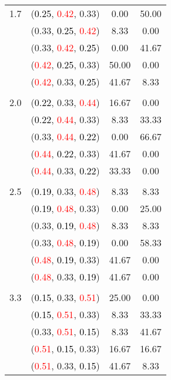 \documentclass[10pt,a4paper]{report}
\begin{document}
\begin{center}
\begin{longtable}{clcc}
		1.7			&(\textcolor{black}{0.25}, \textcolor{red}{0.42}, 0.33)&0.00&50.00\\
			&(0.33, \textcolor{black}{0.25}, \textcolor{red}{0.42})&8.33&0.00\\
			&(0.33, \textcolor{red}{0.42}, \textcolor{black}{0.25})&0.00&41.67\\
			&(\textcolor{red}{0.42}, \textcolor{black}{0.25}, 0.33)&50.00&0.00\\
			&(\textcolor{red}{0.42}, 0.33, \textcolor{black}{0.25})&41.67&8.33\\
		&&&\\
		2.0			&(\textcolor{black}{0.22}, 0.33, \textcolor{red}{0.44})&16.67&0.00\\
			&(\textcolor{black}{0.22}, \textcolor{red}{0.44}, 0.33)&8.33&33.33\\
			&(0.33, \textcolor{red}{0.44}, \textcolor{black}{0.22})&0.00&66.67\\
			&(\textcolor{red}{0.44}, \textcolor{black}{0.22}, 0.33)&41.67&0.00\\
			&(\textcolor{red}{0.44}, 0.33, \textcolor{black}{0.22})&33.33&0.00\\
		&&&\\
		2.5			&(\textcolor{black}{0.19}, 0.33, \textcolor{red}{0.48})&8.33&8.33\\
			&(\textcolor{black}{0.19}, \textcolor{red}{0.48}, 0.33)&0.00&25.00\\
			&(0.33, \textcolor{black}{0.19}, \textcolor{red}{0.48})&8.33&8.33\\
			&(0.33, \textcolor{red}{0.48}, \textcolor{black}{0.19})&0.00&58.33\\
			&(\textcolor{red}{0.48}, \textcolor{black}{0.19}, 0.33)&41.67&0.00\\
			&(\textcolor{red}{0.48}, 0.33, \textcolor{black}{0.19})&41.67&0.00\\
		&&&\\
		3.3			&(\textcolor{black}{0.15}, 0.33, \textcolor{red}{0.51})&25.00&0.00\\
			&(\textcolor{black}{0.15}, \textcolor{red}{0.51}, 0.33)&8.33&33.33\\
			&(0.33, \textcolor{red}{0.51}, \textcolor{black}{0.15})&8.33&41.67\\
			&(\textcolor{red}{0.51}, \textcolor{black}{0.15}, 0.33)&16.67&16.67\\
			&(\textcolor{red}{0.51}, 0.33, \textcolor{black}{0.15})&41.67&8.33\\
		\bottomrule
	\end{longtable}
\end{center}
\end{document}
